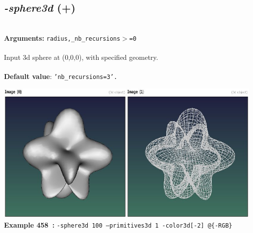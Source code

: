 \documentclass[a4paper,11pt,twoside]{book}
\begin{document}
\subsection{\emph{-sphere3d} (+)}\vspace*{-0.5em}
~\\\textbf{Arguments: } 
{\small \texttt{radius,\_nb\_recursions$>$=0}}\\~\\
Input 3d sphere at (0,0,0), with specified geometry.
~\\~\\\textbf{Default value}: {\small \texttt{'nb\_recursions=3'.}}
\begin{center}\includegraphics[keepaspectratio=true,height=7cm,width=\textwidth]{img/gmic_def458.jpg}\\
{\footnotesize \textbf{Example 458~:} \texttt{-sphere3d 100 --primitives3d 1  -color3d[-2] @\{-RGB\}}}
\end{center}
\end{document}
